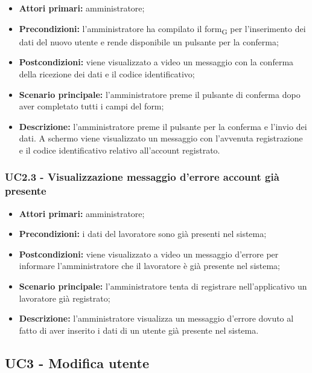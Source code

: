 \begin{itemize}
	\item 	\textbf{Attori primari:} amministratore;
	\item 	\textbf{Precondizioni:} l'amministratore ha compilato il \gls{form}\textsubscript{G} per l'inserimento dei dati del nuovo utente e rende disponibile un pulsante per la conferma;
	\item 	\textbf{Postcondizioni:} viene visualizzato a video un messaggio con la conferma della ricezione dei dati e il codice identificativo;
	\item 	\textbf{Scenario principale:} l'amministratore preme il pulsante di conferma dopo aver completato tutti i campi del form;
	\item 	\textbf{Descrizione:} l'amministratore preme il pulsante per la conferma e l'invio dei dati. A schermo viene visualizzato un messaggio con l'avvenuta registrazione e il codice identificativo relativo all'account registrato.

\end{itemize}

\subsubsection{UC2.3 - Visualizzazione messaggio d'errore account già presente}

\begin{itemize}
	\item 	\textbf{Attori primari:} amministratore;
	\item 	\textbf{Precondizioni:} i dati del lavoratore sono già presenti nel sistema;
	\item 	\textbf{Postcondizioni:} viene visualizzato a video un messaggio d'errore per informare l'amministratore che il lavoratore è già presente nel sistema;
	\item 	\textbf{Scenario principale:} l'amministratore tenta di registrare nell'applicativo un lavoratore già registrato;
	\item 	\textbf{Descrizione:} l'amministratore visualizza un messaggio d'errore dovuto al fatto di aver inserito i dati di un utente già presente nel sistema.
\end{itemize}

\subsection{UC3 - Modifica utente}

